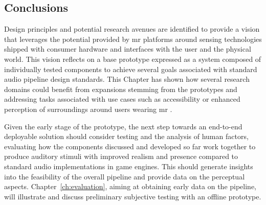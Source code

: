 \subsection{Conclusions}
Design principles and potential research avenues are identified to provide a vision that leverages the potential provided by \acrshort{mr} platforms around sensing technologies shipped with consumer hardware and interfaces with the user and the physical world. This vision reflects on a base prototype expressed as a system composed of individually tested components to achieve several goals associated with standard audio pipeline design standards. This Chapter has shown how several research domains could benefit from expansions stemming from the prototypes and addressing tasks associated with use cases such as accessibility or enhanced perception of surroundings around users wearing \acrshort{mr} .\par
Given the early stage of the prototype, the next step towards an end-to-end deployable solution should consider testing and the analysis of human factors, evaluating how the components discussed and developed so far work together to produce auditory stimuli with improved realism and presence compared to standard audio implementations in game engines. This should generate insights into the feasibility of the overall pipeline and provide data on the perceptual aspects. Chapter~\ref{ch:evaluation}, aiming at obtaining early data on the pipeline, will illustrate and discuss preliminary subjective testing with an offline prototype.
